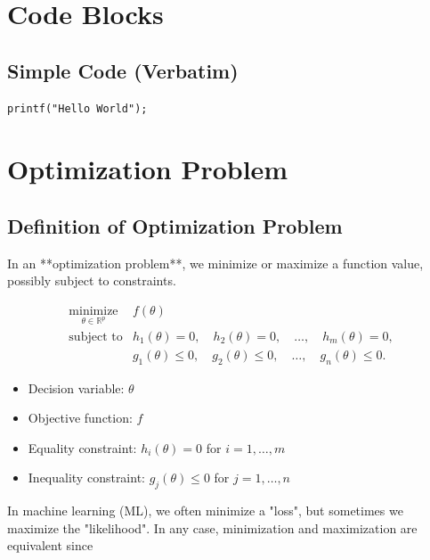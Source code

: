 \documentclass{report}
\begin{document}
\chapter{Code Blocks}

\section{Simple Code (Verbatim)}
\begin{verbatim}
printf("Hello World");
\end{verbatim}

\chapter{Optimization Problem}

\section{Definition of Optimization Problem}

\begin{definition}
    In an **optimization problem**, we minimize or maximize a function value, possibly subject to constraints.

    $$
    \begin{array}{ll}
    \underset{\theta \in \mathbb{R}^{p}}{\operatorname{minimize}} & f(\theta) \\[1em]
    \text {subject to} & h_{1}(\theta) = 0, \quad h_{2}(\theta) = 0, \quad \dots, \quad h_{m}(\theta) = 0, \\[0.5em]
    & g_{1}(\theta) \leq 0, \quad g_{2}(\theta) \leq 0, \quad \dots, \quad g_{n}(\theta) \leq 0.
    \end{array}
    $$

    \begin{itemize}
        \item Decision variable: $\theta$
        \item Objective function: $f$
        \item Equality constraint: $h_{i}(\theta)=0$ for $i=1, \ldots, m$
        \item Inequality constraint: $g_{j}(\theta) \leq 0$ for $j=1, \ldots, n$
    \end{itemize}
\end{definition}

In machine learning (ML), we often minimize a "loss", but sometimes we maximize the "likelihood".
In any case, minimization and maximization are equivalent since
\end{document}
